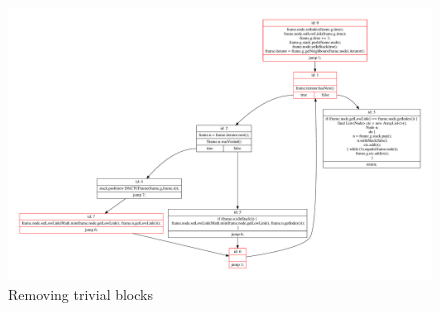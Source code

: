 \begin{figure}
    \centering
    \includegraphics[width=\linewidth]{src/graph/trivial-before.pdf}
    \caption{Removing trivial blocks\label{img:remove}}
\end{figure}